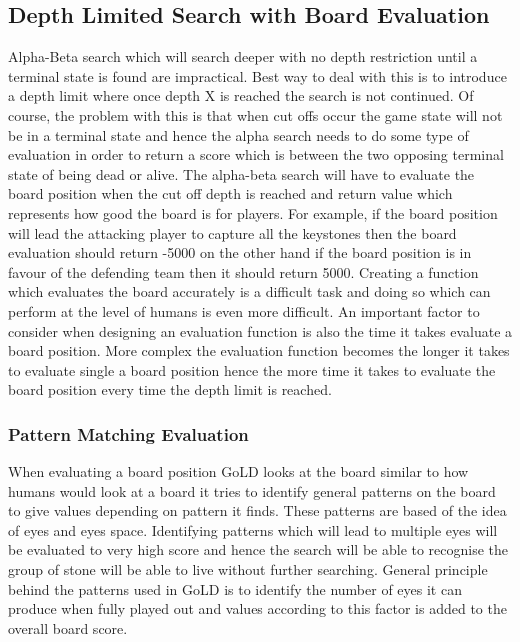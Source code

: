 \documentclass{l4proj}
\begin{document}
\subsection{Depth Limited Search with Board Evaluation}
Alpha-Beta search which will search deeper with no depth restriction until a terminal state is found are impractical. Best way to deal with this is to introduce a depth limit where once depth X is reached the search is not continued. Of course, the problem with this is that when cut offs occur the game state will not be in a terminal state and hence the alpha search needs to do some type of evaluation in order to return a score which is between the two opposing terminal state of being dead or alive. The alpha-beta search will have to evaluate the board position when the cut off depth is reached and return value which represents how good the board is for players. For example, if the board position will lead the attacking player to capture all the keystones then the board evaluation should return -5000  on the other hand if the board position is in favour of the defending team then it should return 5000. Creating a function which evaluates the board accurately is a difficult task and doing so which can perform at the level of humans is even more difficult. An important factor to consider when designing an evaluation function is also the time it takes evaluate a board position. More complex the evaluation function becomes the longer it takes to evaluate single a  board position hence the more time it takes to evaluate the board position every time the depth limit is reached.


\subsubsection{Pattern Matching Evaluation}

When evaluating a board position GoLD looks at the board similar to how humans would look at a board it tries to identify general patterns on the board to give values depending on pattern it finds. These patterns are based of the idea of eyes and eyes space. Identifying patterns which will lead to multiple eyes will be evaluated to very high score and hence the search will be able to recognise the group of stone will be able to live without further searching. General principle behind the patterns used in GoLD is to identify the number of eyes it can produce when fully played out and values according to this factor is added to the overall board score.
\end{document}
